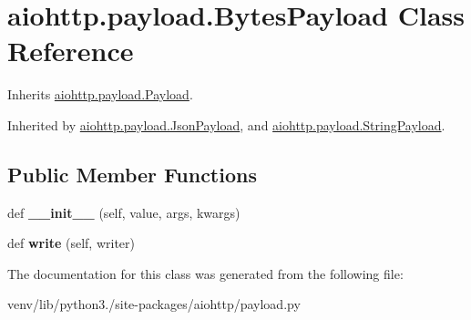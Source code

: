 \hypertarget{classaiohttp_1_1payload_1_1_bytes_payload}{}\section{aiohttp.\+payload.\+Bytes\+Payload Class Reference}
\label{classaiohttp_1_1payload_1_1_bytes_payload}


Inherits \hyperlink{classaiohttp_1_1payload_1_1_payload}{aiohttp.\+payload.\+Payload}.



Inherited by \hyperlink{classaiohttp_1_1payload_1_1_json_payload}{aiohttp.\+payload.\+Json\+Payload}, and \hyperlink{classaiohttp_1_1payload_1_1_string_payload}{aiohttp.\+payload.\+String\+Payload}.

\subsection*{Public Member Functions}
\begin{DoxyCompactItemize}
\item 
\mbox{\label{classaiohttp_1_1payload_1_1_bytes_payload_a913431e842e9a82dfe60328f669a0501}} 
def {\bfseries \+\_\+\+\_\+init\+\_\+\+\_\+} (self, value, args, kwargs)
\item 
\mbox{\label{classaiohttp_1_1payload_1_1_bytes_payload_a651b25ce96a30425b9f6c8826b0b0dde}} 
def {\bfseries write} (self, writer)
\end{DoxyCompactItemize}


The documentation for this class was generated from the following file\+:\begin{DoxyCompactItemize}
\item 
venv/lib/python3./site-\/packages/aiohttp/payload.\+py\end{DoxyCompactItemize}
